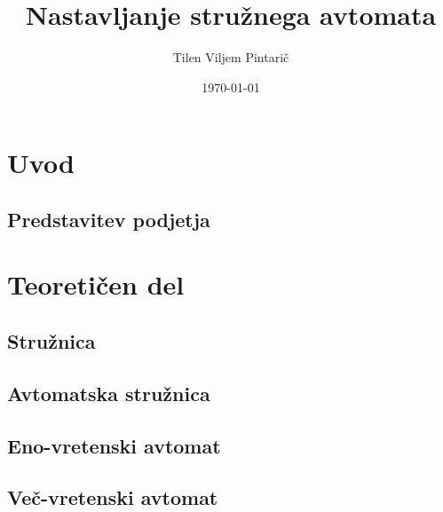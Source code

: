 \documentclass[a4paper, 12pt]{article}
\title{Nastavljanje stružnega avtomata}
\author{Tilen Viljem Pintarič}
\date{\today}
\begin{document}


\newpage\null\thispagestyle{empty}\newpage



\pagestyle{fancy}
\fancyhf{}
\renewcommand{\headrulewidth}{0pt}
\fancyfoot[R]{\fontsize{12}{18} \thepage}


\newpage

\tableofcontents
\newpage

\listoffigures
\newpage

\listoftables
\newpage

\begin{sloppypar}
	\section{Uvod}
	\subsection{Predstavitev podjetja}
	
	
	\section{Teoretičen del}
	\subsection{Stružnica}
	
	
	\subsection{Avtomatska stružnica}
	
	
	\subsection{Eno-vretenski avtomat}
	
	
	\subsection{Več-vretenski avtomat}
	
	

\end{sloppypar}
\end{document}
